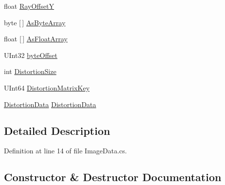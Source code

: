 \begin{DoxyCompactItemize}
\item 
float \mbox{\hyperlink{class_leap_internal_1_1_image_data_acc9885babfe601839ab94f511fa5e790}{Ray\+OffsetY}}
\item 
byte \mbox{[}$\,$\mbox{]} \mbox{\hyperlink{class_leap_internal_1_1_image_data_a63f037ae55493d11d3c954a8fd5fba96}{As\+Byte\+Array}}
\item 
float \mbox{[}$\,$\mbox{]} \mbox{\hyperlink{class_leap_internal_1_1_image_data_a064d0bc313ecd08839a255a5a4a5251b}{As\+Float\+Array}}
\item 
U\+Int32 \mbox{\hyperlink{class_leap_internal_1_1_image_data_a76553e860a4f525c28de15f343684dbf}{byte\+Offset}}
\item 
int \mbox{\hyperlink{class_leap_internal_1_1_image_data_afecf213fb71842f7e847f15dfe994af9}{Distortion\+Size}}
\item 
U\+Int64 \mbox{\hyperlink{class_leap_internal_1_1_image_data_a9ed8f45d53dce8b664c18968b7fa373f}{Distortion\+Matrix\+Key}}
\item 
\mbox{\hyperlink{class_leap_1_1_distortion_data}{Distortion\+Data}} \mbox{\hyperlink{class_leap_internal_1_1_image_data_a0deb7c8a27be924edda6a059bf5b6f14}{Distortion\+Data}}
\end{DoxyCompactItemize}


\subsection{Detailed Description}


Definition at line 14 of file Image\+Data.\+cs.



\subsection{Constructor \& Destructor Documentation}
\mbox{\label{class_leap_internal_1_1_image_data_a3df0a6eae342b22f18f7e4c1386488c1}} 
